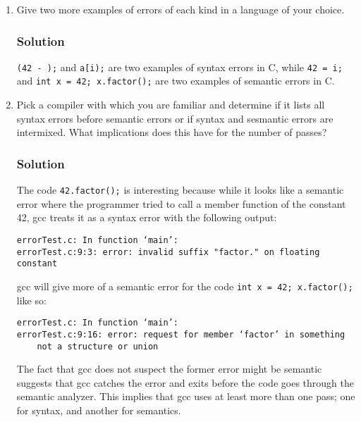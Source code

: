 \documentclass[12pt]{article}
\begin{document}
\begin{enumerate}
\item Give two more examples of errors of each kind in a language of your choice.

\subsubsection*{Solution}
{\tt (42 - );} and {\tt a[i);} are two examples of syntax errors in C, while {\tt 42 = i;} and {\tt int x = 42; x.factor();} are two examples of semantic errors in C.

\item Pick a compiler with which you are familiar and determine if it lists all syntax errors before semantic errors or if syntax and sesmantic errors are intermixed. What implications does this have for the number of passes?

\subsubsection*{Solution}
The code {\tt 42.factor();} is interesting because while it looks like a semantic error where the programmer tried to call a member function of the constant 42, gcc treats it as a syntax error with the following output:

\begin{verbatim}
errorTest.c: In function ‘main’:
errorTest.c:9:3: error: invalid suffix "factor." on floating constant
\end{verbatim}

gcc will give more of a semantic error for the code {\tt int x = 42; x.factor();} like so:

\begin{verbatim}
errorTest.c: In function ‘main’:
errorTest.c:9:16: error: request for member ‘factor’ in something
    not a structure or union
\end{verbatim}

The fact that gcc does not suspect the former error might be semantic suggests that gcc catches the error and exits before the code goes through the semantic analyzer. This implies that gcc uses at least more than one pass; one for syntax, and another for semantics.
\end{enumerate}
\end{document}
